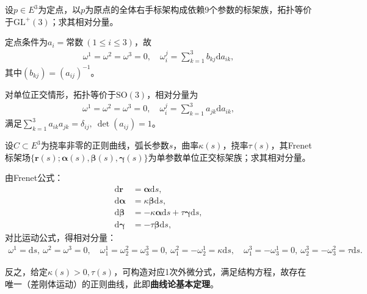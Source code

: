 \documentclass[../../main.tex]{subfiles}%
\begin{document}
\begin{example}
设$p\in E^3$为定点，以$p$为原点的全体右手标架构成依赖9个参数的标架族，拓扑等价于$\mathrm{GL}^+(3)$；求其相对分量。
\end{example}
\begin{solution}

定点条件为$a_i=\text{常数}\ (1\leqslant i\leqslant3)$，故
\begin{align*}
\omega^1=\omega^2=\omega^3=0,\quad \omega_i^j=\sum\limits_{k=1}^3b_{kj}\mathrm{d}a_{ik},
\end{align*}
其中$(b_{kj})=(a_{ij})^{-1}$。

对单位正交情形，拓扑等价于$\mathrm{SO}(3)$，相对分量为
\begin{align*}
\omega^1=\omega^2=\omega^3=0,\quad \omega_i^j=\sum\limits_{k=1}^3a_{jk}\mathrm{d}a_{ik},
\end{align*}
满足$\sum\limits_{k=1}^3a_{ik}a_{jk}=\delta_{ij},\ \det(a_{ij})=1$。

\end{solution}

\begin{example}
设$C\subset E^3$为挠率非零的正则曲线，弧长参数$s$，曲率$\kappa(s)$，挠率$\tau(s)$，其Frenet标架场$\{\boldsymbol{r}(s);\boldsymbol{\alpha}(s),\boldsymbol{\beta}(s),\boldsymbol{\gamma}(s)\}$为单参数单位正交标架族；求其相对分量。
\end{example}
\begin{solution}

由Frenet公式：
\begin{align*}
\mathrm{d}\boldsymbol{r}&=\boldsymbol{\alpha}\mathrm{d}s,\\
\mathrm{d}\boldsymbol{\alpha}&=\kappa\boldsymbol{\beta}\mathrm{d}s,\\
\mathrm{d}\boldsymbol{\beta}&=-\kappa\boldsymbol{\alpha}\mathrm{d}s+\tau\boldsymbol{\gamma}\mathrm{d}s,\\
\mathrm{d}\boldsymbol{\gamma}&=-\tau\boldsymbol{\beta}\mathrm{d}s,
\end{align*}
对比运动公式，得相对分量：
\begin{align*}
\omega^1=\mathrm{d}s,\ \omega^2=\omega^3=0,\quad \omega_1^1=\omega_2^2=\omega_3^3=0,\ \omega_1^2=-\omega_2^1=\kappa\mathrm{d}s,\quad \omega_1^3=-\omega_3^1=0,\ \omega_2^3=-\omega_3^2=\tau\mathrm{d}s.
\end{align*}

反之，给定$\kappa(s)>0,\tau(s)$，可构造对应1次外微分式，满足结构方程，故存在唯一（差刚体运动）的正则曲线，此即\textbf{曲线论基本定理}。

\end{solution}
\end{document}
